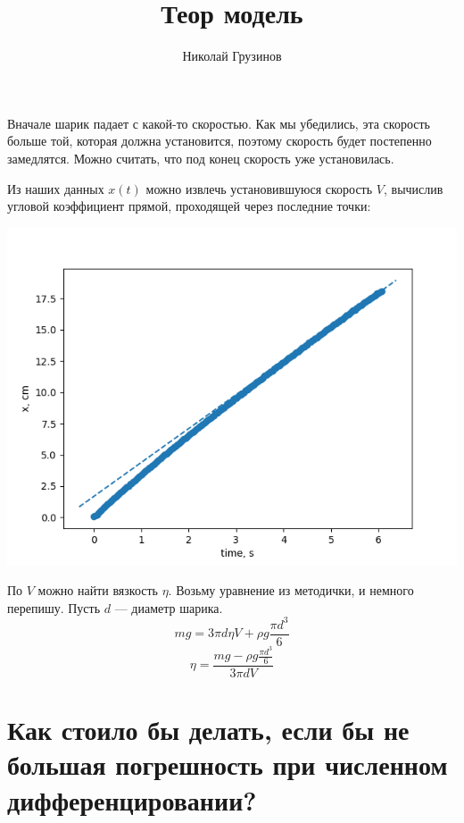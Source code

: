 \documentclass[a4paper, 12pt]{article}
\title{Теор модель}
\author{Николай Грузинов}
\date{}%
\begin{document}
\maketitle

Вначале шарик падает с какой-то скоростью.
Как мы убедились, эта скорость больше той, которая должна установится, поэтому скорость будет постепенно замедлятся.
Можно считать, что под конец скорость уже установилась.

Из наших данных $x(t)$ можно извлечь установившуюся скорость $V$, вычислив угловой коэффициент прямой, проходящей через последние точки:
\begin{center}
\includegraphics[width=0.7\linewidth]{approximation_0.png}
\end{center}

По $V$ можно найти вязкость $\eta$.
Возьму уравнение из методички, и немного перепишу.
Пусть $d$ --- диаметр шарика.
\[ m g = 3 \pi d \eta V+\rho g \frac{\pi d^{3}}{6} \]
\[ \eta = \frac{m g-\rho g \frac{\pi d^{3}}{6} }{3 \pi d V} \]

\section*{Как стоило бы делать, если бы не большая погрешность при численном дифференцировании?}
\end{document}
